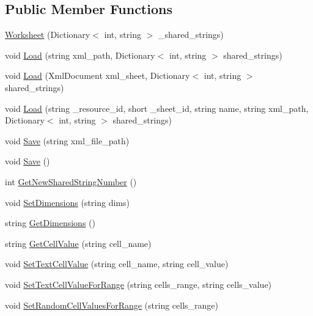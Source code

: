\subsection*{Public Member Functions}
\begin{DoxyCompactItemize}
\item 
\hyperlink{classfastxcel_1_1_worksheet_aeca37b714419be22639de9af588aae68}{Worksheet} (Dictionary$<$ int, string $>$ \_\-shared\_\-strings)
\item 
void \hyperlink{classfastxcel_1_1_worksheet_a47de2fd4d32338e441034f2cce1fa70d}{Load} (string xml\_\-path, Dictionary$<$ int, string $>$ shared\_\-strings)
\item 
void \hyperlink{classfastxcel_1_1_worksheet_aa133a70afbdf63ee270c54adf74e08be}{Load} (XmlDocument xml\_\-sheet, Dictionary$<$ int, string $>$ shared\_\-strings)
\item 
void \hyperlink{classfastxcel_1_1_worksheet_a6f709d58e6c6e69b9e92285e64bb7537}{Load} (string \_\-resource\_\-id, short \_\-sheet\_\-id, string name, string xml\_\-path, Dictionary$<$ int, string $>$ shared\_\-strings)
\item 
void \hyperlink{classfastxcel_1_1_worksheet_a8d4ae885f06c8bd2eff1e567df430395}{Save} (string xml\_\-file\_\-path)
\item 
void \hyperlink{classfastxcel_1_1_worksheet_a408e5140faee4aa42fef7b2d18aa8129}{Save} ()
\item 
int \hyperlink{classfastxcel_1_1_worksheet_a0f4be9f34872659f91ad529d3adbd99b}{GetNewSharedStringNumber} ()
\item 
void \hyperlink{classfastxcel_1_1_worksheet_a4715306fdd8f6c3a22a9e0e7bac6fbea}{SetDimensions} (string dims)
\item 
string \hyperlink{classfastxcel_1_1_worksheet_a65201aab04853470de5944ddbdcbc6d2}{GetDimensions} ()
\item 
string \hyperlink{classfastxcel_1_1_worksheet_a624099f4b412f91c1109849cd82b84c6}{GetCellValue} (string cell\_\-name)
\item 
void \hyperlink{classfastxcel_1_1_worksheet_a4eefcdd5bed53bac52c10889f4f0a0b4}{SetTextCellValue} (string cell\_\-name, string cell\_\-value)
\item 
void \hyperlink{classfastxcel_1_1_worksheet_add0092f67c545fc53d0684b4fc38052d}{SetTextCellValueForRange} (string cells\_\-range, string cells\_\-value)
\item 
void \hyperlink{classfastxcel_1_1_worksheet_ad8b9a225bf2773781bee8076af31c6ae}{SetRandomCellValuesForRange} (string cells\_\-range)
\end{DoxyCompactItemize}
